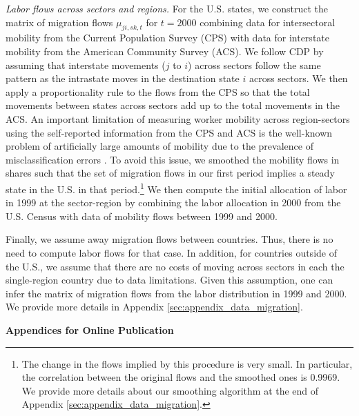 \documentclass[12pt]{article}
\begin{document}
{\textit{Labor flows across sectors and regions.}} For the U.S. states, we construct the matrix of migration flows $\mu_{ji,sk,t}$ for $t = 2000$ combining data for intersectoral mobility from the Current Population Survey (CPS) with data for interstate mobility from the American Community Survey (ACS). We follow CDP by assuming that interstate movements ($j$ to $i$) across sectors follow the same pattern as the intrastate moves in the destination state $i$ across sectors. We then apply a proportionality rule to the flows from the CPS so that the total movements between states across sectors add up to the total movements in the ACS. An important limitation of measuring worker mobility across region-sectors using the self-reported information from the CPS and ACS is the well-known problem of artificially large amounts of mobility due to the prevalence of misclassification errors \citep{murphy1987unemployment,kambourov2008rising,kambourov2013cautionary,Dvorkin2021}. To avoid this issue, we smoothed the mobility flows in shares such that the set of migration flows in our first period implies a steady state in the U.S. in that period.\footnote{The change in the flows implied by this procedure is very small. In particular, the correlation between the original flows and the smoothed ones is 0.9969. We provide more details about our smoothing algorithm at the end of Appendix \ref{sec:appendix_data_migration}.} We then compute the initial allocation of labor in 1999 at the sector-region by combining the labor allocation in 2000 from the U.S. Census with data of mobility flows between 1999 and 2000. 

Finally, we assume away migration flows between countries. Thus, there is no need to compute labor flows for that case. In addition, for countries outside of the U.S., we assume that there are no costs of moving across sectors in each the single-region country due to data limitations. Given this assumption, one can infer the matrix of migration flows from the labor distribution in 1999 and 2000. We provide more details in Appendix \ref{sec:appendix_data_migration}.

\clearpage
\setcounter{page}{1}
\renewcommand{\theequation}{\Alph{section}\arabic{equation}}
\setcounter{equation}{0}
\noindent
{\LARGE \textbf{Appendices for Online Publication}}
\setlength{\belowdisplayskip}{3pt}
\setlength{\belowdisplayshortskip}{3pt}
\setlength{\abovedisplayskip}{3pt}
\setlength{\abovedisplayshortskip}{3pt}
\end{document}
